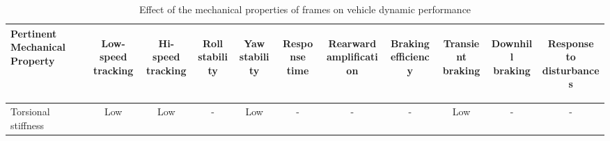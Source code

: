\begin{table}[H]
	\centering\footnotesize
	\begin{threeparttable}
	
        \begin{tabulary}{\textwidth}{lcccccccccc}
            \toprule
            \textbf{Pertinent Mechanical Property} & \begin{sideways}\textbf{Low-speed tracking}\end{sideways} & \begin{sideways}\textbf{Hi-speed tracking}\end{sideways} & \begin{sideways}\textbf{Roll stability}\end{sideways} & \begin{sideways}\textbf{Yaw stability}\end{sideways} & \begin{sideways}\textbf{Response time}\end{sideways} & \begin{sideways}\textbf{Rearward amplification}\end{sideways} & \begin{sideways}\textbf{Braking efficiency}\end{sideways} & \begin{sideways}\textbf{Transient braking}\end{sideways} & \begin{sideways}\textbf{Downhill braking}\end{sideways} & \begin{sideways}\textbf{Response to disturbances}\end{sideways} \\\midrule
            Torsional stiffness & Low   & Low   & -     & Low   & -     & -     & -     & Low   & -     & -\\
            \bottomrule
		\end{tabulary}

		\caption{Effect of the mechanical properties of frames on vehicle dynamic performance}
		\label{table:effect-of-the-mechanical-properties-of-frames-on-vehicle-dynamic-performance}

	\end{threeparttable}
\end{table}

